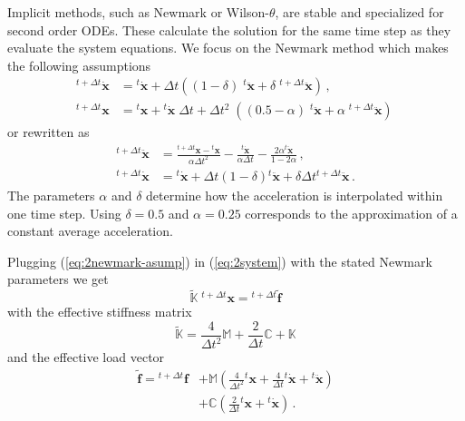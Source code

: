 \documentclass[conference]{journal}
\newcommand{\bb}[1]{\mathbb{#1}}
\newcommand{\B}[1]{\mathbf{#1}}
\newcommand{\Bx}{\B{x}}
\newcommand{\xt}{{}^{t}\Bx}
\newcommand{\vt}{{}^{t}\dot{\Bx}}
\newcommand{\at}{{}^{t}\ddot{\Bx}}
\newcommand{\xtt}{{}^{t+\Delta t}\Bx}
\newcommand{\vtt}{{}^{t+\Delta t}\dot{\Bx}}
\newcommand{\att}{{}^{t+\Delta t}\ddot{\Bx}}
\newcommand{\M}{\bb{M}}
\newcommand{\C}{\bb{C}}
\newcommand{\K}{\bb{K}}
\begin{document}
	Implicit methods, such as Newmark or Wilson-$\theta$, are stable and specialized for second order ODEs. These calculate the solution for the same time step as they evaluate the system equations. We focus on the Newmark method which makes the following assumptions
	\begin{equation} \label{eq:2newmark-asump}
	\begin{aligned}
	\vtt &= \vt 
	+ \Delta t \left((1-\delta)\; \at + \delta\;\att \right)\,,
	\\[.5em]
	\xtt &= \xt + \vt\;\Delta t
	+ \Delta t^2\;\left((0.5-\alpha) \; \at + \alpha\;\att \right)\,
	\end{aligned}
	\end{equation}
	or rewritten as
	\begin{equation} \label{eq:2newmark-asump-re}
	\begin{aligned}
	\att &= \frac{\xtt - \xt}{\alpha \Delta t^2} - \frac{\vt}{\alpha \Delta t} - \frac{2 \alpha \at}{1 - 2\alpha}\,,
	\\[.5em]
	\vtt &= \vt + \Delta t (1-\delta) \at + \delta \Delta t \att\,.
	\end{aligned}
	\end{equation}
	The parameters $\alpha$ and $\delta$ determine how the acceleration is interpolated within one time step. Using $\delta=0.5$ and $\alpha=0.25$ corresponds to the approximation of a constant average acceleration.
	

	Plugging (\ref{eq:2newmark-asump}) in (\ref{eq:2system}) with the stated Newmark parameters we get
	\begin{equation} \label{eq:2newmark-solve}
	\widetilde{\K}\;\xtt = {}^{t+\Delta t}\widetilde{\B{f}}
	\end{equation}
	with the effective stiffness matrix
	\begin{equation} \label{eq:2newmark-K}
	\widetilde{\K} = \frac{4}{\Delta t^2} \M + \frac{2}{\Delta t} \C + \K
	\end{equation}
	and the effective load vector
	\begin{equation} \label{eq:2newmark-f}
	\begin{aligned}
	\widetilde{\B{f}} = {}^{t+\Delta t}{\B{f}}
	&+ \M \left( \frac{4}{\Delta t^2} \xt + \frac{4}{\Delta t} \vt + \at \right)
	\\
	&+ \C \left( \frac{2}{\Delta t} \xt + \vt \right)\,.
	\end{aligned}
	\end{equation}
\end{document}
